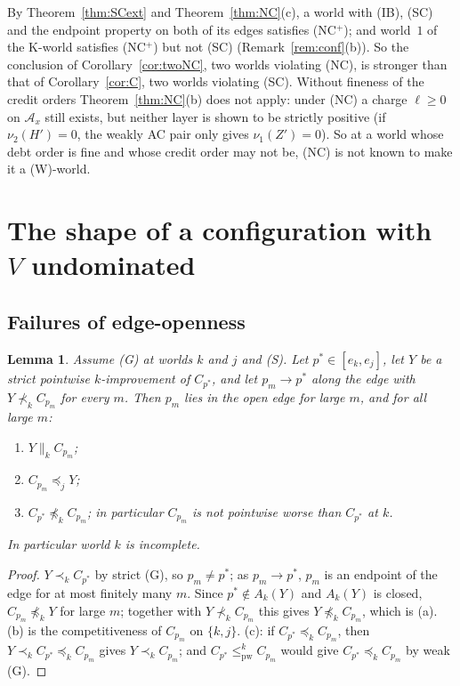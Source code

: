\documentclass[11pt]{article}
\newtheorem{lemma}[theorem]{Lemma}
\theoremstyle{definition}\newtheorem{definition}[theorem]{Definition}
\theoremstyle{remark}\newtheorem{remark}[theorem]{Remark}
\newcommand{\pw}{\mathrm{pw}}
\begin{document}
By Theorem~\ref{thm:SCext} and Theorem~\ref{thm:NC}(c), a world with (IB),
(SC) and the endpoint property on both of its edges satisfies (NC$^+$); and
world~$1$ of the K-world satisfies (NC$^+$) but not (SC)
(Remark~\ref{rem:conf}(b)). So the conclusion of
Corollary~\ref{cor:twoNC}, two worlds violating (NC), is stronger than that
of Corollary~\ref{cor:C}, two worlds violating (SC). Without fineness of the
credit orders Theorem~\ref{thm:NC}(b) does not apply: under (NC) a charge
$\ell\ge0$ on $\mathcal A_x$ still exists, but neither layer is shown to be
strictly positive (if $\nu_2(H')=0$, the weakly AC pair only gives
$\nu_1(Z')=0$). So at a world whose debt order is fine and whose credit
order may not be, (NC) is not known to make it a (W)-world.

\section{The shape of a configuration with \texorpdfstring{$V$}{V} undominated}\label{sec:shape}

\subsection{Failures of edge-openness}\label{sec:Ra}

\begin{lemma}\label{lem:Ra}
Assume (G) at worlds $k$ and $j$ and (S). Let $p^*\in[e_k,e_j]$, let $Y$ be
a strict pointwise $k$-improvement of $C_{p^*}$, and let $p_m\to p^*$ along
the edge with $Y\not\prec_kC_{p_m}$ for every $m$. Then $p_m$ lies in the
open edge for large $m$, and for all large $m$:
\begin{enumerate}[label=(\alph*),leftmargin=*,itemsep=1pt]
\item $Y\parallel_kC_{p_m}$;
\item $C_{p_m}\preceq_jY$;
\item $C_{p^*}\not\preceq_kC_{p_m}$; in particular $C_{p_m}$ is not
pointwise worse than $C_{p^*}$ at $k$.
\end{enumerate}
In particular world $k$ is incomplete.
\end{lemma}
\begin{proof}
$Y\prec_kC_{p^*}$ by strict (G), so $p_m\ne p^*$; as $p_m\to p^*$, $p_m$ is
an endpoint of the edge for at most finitely many $m$. Since $p^*\notin
A_k(Y)$ and $A_k(Y)$ is closed, $C_{p_m}\not\preceq_kY$ for large $m$;
together with $Y\not\prec_kC_{p_m}$ this gives $Y\not\preceq_kC_{p_m}$, which
is (a). (b) is the competitiveness of $C_{p_m}$ on $\{k,j\}$. (c): if
$C_{p^*}\preceq_kC_{p_m}$, then $Y\prec_kC_{p^*}\preceq_kC_{p_m}$ gives
$Y\prec_kC_{p_m}$; and $C_{p^*}\le^k_\pw C_{p_m}$ would give
$C_{p^*}\preceq_kC_{p_m}$ by weak (G).
\end{proof}
\end{document}
